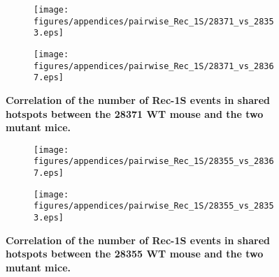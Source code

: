 \begin{figure}[h!]
    \centering
    \begin{subfigure}[b]{0.75\textwidth}
        \texttt{[image: figures/appendices/pairwise\_Rec\_1S/28371\_vs\_28353.eps]}
    \end{subfigure}

    \vspace{0.5cm}

    \begin{subfigure}[b]{0.75\textwidth}
        \texttt{[image: figures/appendices/pairwise\_Rec\_1S/28371\_vs\_28367.eps]}
    \end{subfigure}

	\caption[Correlation of the number of Rec-1S events in shared hotspots between the 28371 WT mouse and the two mutant mice]
    {\textbf{Correlation of the number of Rec-1S events in shared hotspots between the 28371 WT mouse and the two mutant mice.}
    }
\label{fig:pairwise-RR-shared-Rec1S-2}
\end{figure}




\begin{figure}[h!]
    \centering
   
	\begin{subfigure}[b]{0.75\textwidth}
        \texttt{[image: figures/appendices/pairwise\_Rec\_1S/28355\_vs\_28367.eps]}
    \end{subfigure}

    \vspace{0.5cm}
    
	\begin{subfigure}[b]{0.75\textwidth}
        \texttt{[image: figures/appendices/pairwise\_Rec\_1S/28355\_vs\_28353.eps]}
    \end{subfigure}


    \caption[Correlation of the number of Rec-1S events in shared hotspots between the 28355 WT mouse and the two mutant mice]
    {\textbf{Correlation of the number of Rec-1S events in shared hotspots between the 28355 WT mouse and the two mutant mice.}
    }
\label{fig:pairwise-RR-shared-Rec1S-3}
\end{figure}


